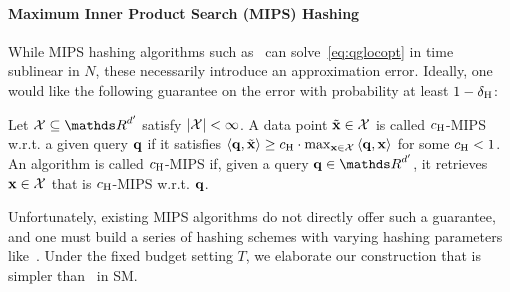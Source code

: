 \vspace{-6pt}
\paragraph{Maximum Inner Product Search (MIPS) Hashing}

While MIPS hashing algorithms such as~\cite{shrivastava14asymmetric,shrivastava15improved,neyshabur15on} can solve~\eqref{eq:qglocopt} in time sublinear in $N$, these necessarily introduce an approximation error.
Ideally, one would like the following guarantee on the error with probability at least $1-{\delta}_\text{\normalfont H}$:
\vspace{-3pt}
\begin{defn}\label{def:cmips}
 Let $\cX \subseteq \dsR^{d'}$ satisfy $|\mathcal{X}| < \infty$.
 A data point $\tilde{\mathbf{x}} \in \mathcal{X}$ is called $c_\text{\normalfont H}$-MIPS w.r.t. a given query ${{\mathbf q}}$ if it satisfies ${\langle} {{\mathbf q}}, \tilde{\mathbf{x}} {\rangle} \ge c_\text{\normalfont H} \cdot \max_{\mathbf{x}\in\mathcal{X}}{\langle} {{\mathbf q}}, \mathbf{x} {\rangle}$ for some $c_\text{\normalfont H}<1$.
 An algorithm is called $c_\text{\normalfont H}$-MIPS if, given a query $\q\in {\dsR}^{d'}$, it retrieves $\mathbf{x} \in \mathcal{X}$ that is $c_\text{\normalfont H}$-MIPS w.r.t. ${{\mathbf q}}$.
\end{defn}
\vspace{-5pt}
Unfortunately, existing MIPS algorithms do not directly offer such a guarantee, and one must build a series of hashing schemes with varying hashing parameters like~\citet{indyk12approximate}.
Under the fixed budget setting $T$, we elaborate our construction that is simpler than~\cite{indyk12approximate} in SM.


